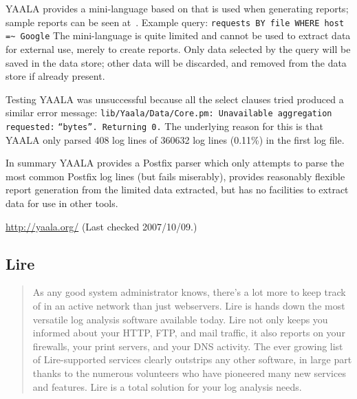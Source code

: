 YAALA provides a mini-language based on \SQL{} that is used when generating
reports; sample reports can be seen at~\cite{yaala-samples}.  Example
query: \newline \tab{} \texttt{requests BY file WHERE host =\~{} Google}
\newline The mini-language is quite limited and cannot be used to extract
data for external use, merely to create reports.  Only data selected by the
query will be saved in the data store; other data will be discarded, and
removed from the data store if already present.

Testing YAALA was unsuccessful because all the select clauses tried
produced a similar error message:
\newline\tab{}\texttt{lib/Yaala/Data/Core.pm: Unavailable aggregation
requested:} \newline\tab{}\texttt{``bytes''. Returning 0.} \newline  The
underlying reason for this is that YAALA only parsed 408 log lines of
360632 log lines (0.11\%) in the first log file.

In summary YAALA provides a Postfix parser which only attempts to parse the
most common Postfix log lines (but fails miserably), provides reasonably
flexible report generation from the limited data extracted, but has no
facilities to extract data for use in other tools.

\url{http://yaala.org/} \newline (Last checked 2007/10/09.)

\subsection{Lire}

\begin{quotation}

    As any good system administrator knows, there's a lot more to keep
    track of in an active network than just webservers. Lire is hands down
    the most versatile log analysis software available today. Lire not only
    keeps you informed about your HTTP, FTP, and mail traffic, it also
    reports on your firewalls, your print servers, and your DNS activity.
    The ever growing list of Lire-supported services clearly outstrips any
    other software, in large part thanks to the numerous volunteers who
    have pioneered many new services and features. Lire is a total solution
    for your log analysis needs.

\end{quotation}

